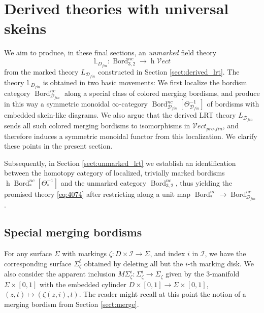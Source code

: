\documentclass[reqno]{amsart}
\theoremstyle{definition}
\newcommand{\mbb}[1]{\mathbb{#1}}
\newcommand{\mcl}[1]{\mathcal{#1}}
\newcommand{\msc}[1]{\mathscr{#1}}
\newcommand{\opn}[1]{\operatorname{#1}}
\newcommand{\Vect}{\msc{V}\!ect}
\newcommand{\pf}{pro\text{-}fin}
\DeclareMathOperator{\Bord}{Bord}
\renewcommand{\1}{\mathbf{1}}
\begin{document}
\section{Derived theories with universal skeins}
\label{sect:derived_w_skeins}

We aim to produce, in these final sections, an \emph{unmarked} field theory
\begin{equation}\label{eq:4074}
\mbb{L}_{D_{fin}}:\Bord^{nc}_{3,2}\to \opn{h}\Vect
\end{equation}
from the marked theory $L_{\msc{D}_{fin}}$ constructed in Section \ref{sect:derived_lrt}. The theory $\mbb{L}_{D_{fin}}$ is obtained in two basic movements: We first localize the bordism category $\Bord_{\msc{D}_{fin}}^{nc}$ along a special class of colored merging bordisms, and produce in this way a symmetric monoidal $\infty$-category $\Bord_{\msc{D}_{fin}}^{nc}[\Theta_{\msc{D}_{fin}}^{-1}]$ of bordisms with embedded skein-like diagrams. We also argue that the derived LRT theory $L_{\msc{D}_{fin}}$ sends all such colored merging bordisms to isomorphisms in $\Vect_{\pf}$, and therefore induces a symmetric monoidal functor from this localization.  We clarify these points in the present section.  
\par

Subsequently, in Section \ref{sect:unmarked_lrt} we establish an identification between the homotopy category of localized, trivially marked bordisms $\opn{h}\Bord_{\ast}^{nc}[\Theta^{-1}_{\ast}]$ and the unmarked category $\Bord^{nc}_{3,2}$, thus yielding the promised theory \eqref{eq:4074} after restricting along a unit map $\Bord^{nc}_{\ast}\to \Bord^{nc}_{\msc{D}_{fin}}$.

\subsection{Special merging bordisms}

For any surface $\Sigma$ with markings $\zeta:D\times \mcl{I}\to \Sigma$, and index $i$ in $\mcl{I}$, we have the corresponding surface $\Sigma^i_{\zeta}$ obtained by deleting all but the $i$-th marking disk. We also consider the apparent inclusion $M\Sigma^i_{\zeta}:\Sigma^i_{\zeta}\to \Sigma_{\zeta}$ given by the $3$-manifold $\Sigma\times[0,1]$ with the embedded cylinder $D\times [0,1]\to \Sigma\times [0,1]$, $(z,t)\mapsto (\zeta(z,i),t)$.  The reader might recall at this point the notion of a merging bordism from Section \ref{sect:merge}.
\end{document}
